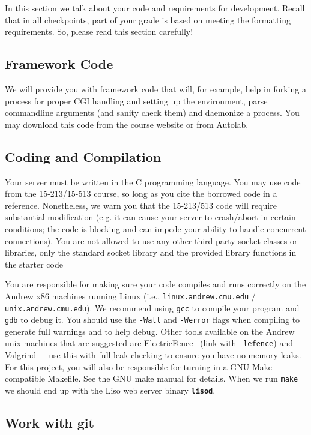 In this section we talk about your code and requirements for development.
Recall that in all checkpoints, part of your grade is based on meeting the formatting requirements. So, please read this section carefully!

\subsection{Framework Code} 
We will provide you with framework code that will, for example, help in forking
a process for proper CGI handling and setting up the environment, parse
commandline arguments (and sanity check them) and daemonize a process.
You may download this code from the course website or from Autolab.

\subsection{Coding and Compilation}
Your server must be written in the C programming language. 
You may use code from the 15-213/15-513 course, so long as you cite the borrowed
code in a reference. 
Nonetheless, we warn you that the 15-213/513 code will require substantial modification 
(e.g. it can cause your server to crash/abort in certain conditions; the code is blocking 
and can impede your ability to handle concurrent connections). You are not allowed
to use any other third party socket classes or libraries, only the standard socket library
and the provided library functions in the starter code 


You are responsible for making sure your code compiles and runs correctly on
the Andrew x86 machines running Linux (i.e., \texttt{linux.andrew.cmu.edu} /
\texttt{unix.andrew.cmu.edu}). We recommend using \texttt{gcc} to compile your
program and \texttt{gdb} to debug it. You should use the \texttt{-Wall} and
\texttt{-Werror} flags when compiling to generate full warnings and to help
debug. Other tools available on the Andrew unix machines that are suggested are
ElectricFence~\cite{WWW:efence} (link with \texttt{-lefence}) and
Valgrind~\cite{WWW:Valgrind}---use this with full leak checking to ensure you
have no memory leaks.  For this project, you will also be responsible
for turning in a GNU Make compatible Makefile. See the GNU make
manual\cite{Manual:Make} for details. When we run \texttt{make} we should end
up with the Liso web server binary \textbf{\texttt{lisod}}.


\subsection{Work with git}


